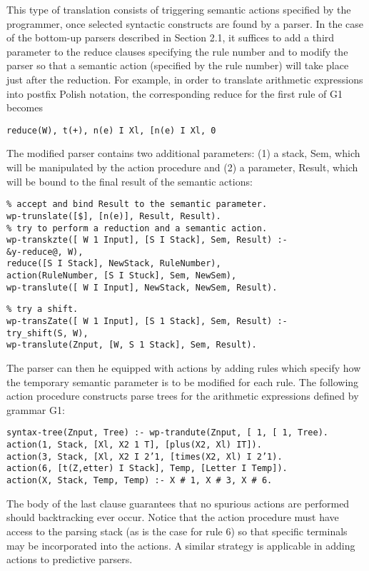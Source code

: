 This type of translation consists of triggering semantic actions specified by the
programmer, once selected syntactic constructs are found by a parser. In the case
of the bottom-up parsers described in Section 2.1, it suffices to add a third
parameter to the reduce clauses specifying the rule number and to modify the
parser so that a semantic action (specified by the rule number) will take place
just after the reduction. For example, in order to translate arithmetic expressions
into postfix Polish notation, the corresponding reduce for the first rule of G1
becomes
\begin{verbatim}
reduce(W), t(+), n(e) I Xl, [n(e) I Xl, 0
\end{verbatim}
The modified parser contains two additional parameters: (1) a stack, Sem, which
will be manipulated by the action procedure and (2) a parameter, Result, which
will be bound to the final result of the semantic actions:
\begin{verbatim}
% accept and bind Result to the semantic parameter.
wp-trunslate([$], [n(e)], Result, Result).
% try to perform a reduction and a semantic action.
wp-transkzte([ W 1 Input], [S I Stack], Sem, Result) :-
&y-reduce@, W),
reduce([S I Stack], NewStack, RuleNumber),
action(RuleNumber, [S I Stuck], Sem, NewSem),
wp-translute([ W I Input], NewStack, NewSem, Result). 
\end{verbatim}
\begin{verbatim}
% try a shift.
wp-transZate([ W 1 Input], [S 1 Stack], Sem, Result) :-
try_shift(S, W),
wp-translute(Znput, [W, S 1 Stack], Sem, Result).  
\end{verbatim}
The parser can then he equipped with actions by adding rules which specify how
the temporary semantic parameter is to be modified for each rule. The following
action procedure constructs parse trees for the arithmetic expressions defined by
grammar G1:
\begin{verbatim}
syntax-tree(Znput, Tree) :- wp-trandute(Znput, [ 1, [ 1, Tree).
action(1, Stack, [Xl, X2 1 T], [plus(X2, Xl) IT]).
action(3, Stack, [Xl, X2 I 2’1, [times(X2, Xl) I 2’1).
action(6, [t(Z,etter) I Stack], Temp, [Letter I Temp]).
action(X, Stack, Temp, Temp) :- X # 1, X # 3, X # 6. 
\end{verbatim}
The body of the last clause guarantees that no spurious actions are performed
should backtracking ever occur. Notice that the action procedure must have
access to the parsing stack (as is the case for rule 6) so that specific terminals
may be incorporated into the actions. A similar strategy is applicable in adding
actions to predictive parsers. 

